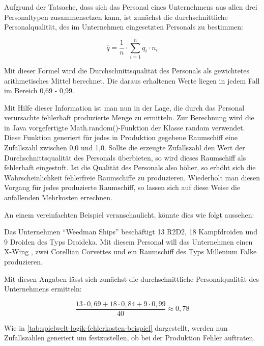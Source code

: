 Aufgrund der Tatsache, dass sich das Personal eines Unternehmens aus allen drei Personaltypen
zusammensetzen kann, ist zunächst die durchschnittliche Personalqualität, des im Unternehmen
eingesetzten Personals zu bestimmen:

\begin{equation}
     \overline{q} = \frac{1}{n} \cdot \sum\limits_{i=1}^n {q_i \cdot n_i}
     \label{alg:spielwelt-logik-fehlerkosten-1}
\end{equation}

Mit dieser Formel wird die Durchschnittsqualität des Personals als gewichtetes arithmetisches Mittel
berechnet. Die daraus erhaltenen Werte liegen in jedem Fall im Bereich 0,69 - 0,99.

Mit Hilfe dieser Information ist man nun in der Lage, die durch das Personal verursachte fehlerhaft
produzierte Menge zu ermitteln. Zur Berechnung wird die in Java vorgefertigte Math.random()-Funktion
der Klasse random verwendet. Diese Funktion generiert für jedes in Produktion gegebene Raumschiff eine
Zufallszahl zwischen 0,0 und 1,0. Sollte die erzeugte Zufallszahl den Wert der Durchschnittsqualität
des Personals überbieten, so wird dieses Raumschiff als fehlerhaft eingestuft. Ist die Qualität des
Personals also höher, so erhöht sich die Wahrscheinlichkeit fehlerfreie Raumschiffe zu produzieren.
Wiederholt man diesen Vorgang für jedes produzierte Raumschiff, so lassen sich auf diese Weise die
anfallenden Mehrkosten errechnen.

\bigskip

An einem vereinfachten Beispiel veranschaulicht, könnte dies wie folgt aussehen:

Das Unternehmen “Weedman Ships” beschäftigt 13 R2D2, 18 Kampfdroiden und 9 Droiden des Typs Droideka.
Mit diesem Personal will das Unternehmen einen X-Wing , zwei Corellian Corvettes und ein Raumschiff
des Typs Millenium Falke produzieren.

Mit diesen Angaben lässt sich zunächst die durchschnittliche Personalqualität des Unternehmens ermitteln:

\begin{equation}
     \frac{13 \cdot 0,69 + 18 \cdot 0,84 + 9 \cdot 0,99}{40} \approx 0,78
     \label{alg:spielwelt-logik-fehlerkosten-Beispiel}
\end{equation}

Wie in \ref{tab:spielwelt-logik-fehlerkosten-beispiel} dargestellt, werden nun Zufallszahlen generiert um
festzustellen, ob bei der Produktion Fehler auftraten.


